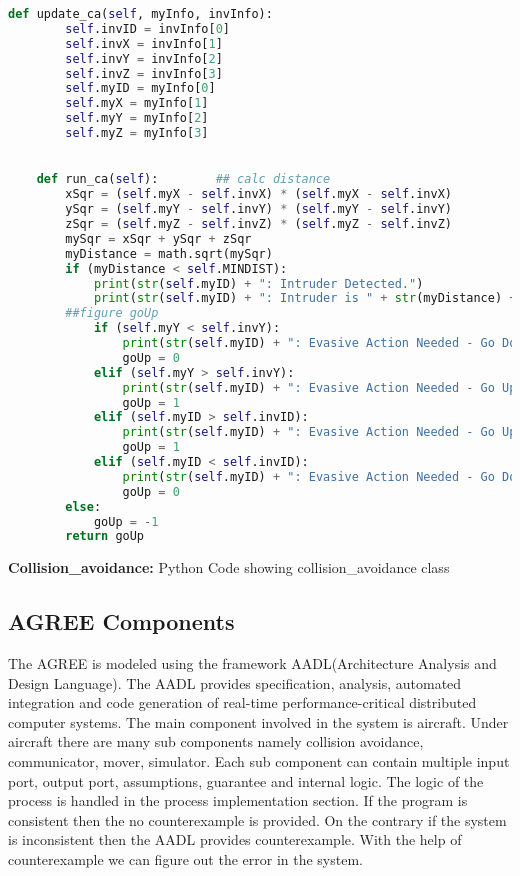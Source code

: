 \documentclass[12pt]{report}
\theoremstyle{plain}
\theoremstyle{definition}
\begin{document}
\begin{lstlisting}[language =Python]
    def update_ca(self, myInfo, invInfo):
        self.invID = invInfo[0]
        self.invX = invInfo[1]
        self.invY = invInfo[2]
        self.invZ = invInfo[3]
        self.myID = myInfo[0]
        self.myX = myInfo[1]
        self.myY = myInfo[2]
        self.myZ = myInfo[3]

    
    def run_ca(self):        ## calc distance
        xSqr = (self.myX - self.invX) * (self.myX - self.invX)
        ySqr = (self.myY - self.invY) * (self.myY - self.invY)
        zSqr = (self.myZ - self.invZ) * (self.myZ - self.invZ)
        mySqr = xSqr + ySqr + zSqr
        myDistance = math.sqrt(mySqr)
        if (myDistance < self.MINDIST):
            print(str(self.myID) + ": Intruder Detected.")
            print(str(self.myID) + ": Intruder is " + str(myDistance) + " units away.")
        ##figure goUp
            if (self.myY < self.invY):
                print(str(self.myID) + ": Evasive Action Needed - Go Down!")
                goUp = 0
            elif (self.myY > self.invY):
                print(str(self.myID) + ": Evasive Action Needed - Go Up!")
                goUp = 1
            elif (self.myID > self.invID):
                print(str(self.myID) + ": Evasive Action Needed - Go Up!")
                goUp = 1
            elif (self.myID < self.invID):
                print(str(self.myID) + ": Evasive Action Needed - Go Down!")
                goUp = 0
        else:
            goUp = -1
        return goUp
\end{lstlisting}
\begin{center}
\footnotesize{\textbf{Collision\_avoidance:} Python Code showing collision\_avoidance class}
\end{center}
\subsection*{AGREE Components}
The AGREE is modeled using the framework AADL(Architecture Analysis and Design Language). The AADL provides  specification, analysis, automated integration and code generation of real-time performance-critical distributed computer systems. The main component involved in the system is aircraft. Under aircraft there are many sub components namely collision avoidance, communicator, mover, simulator. Each sub component can contain multiple input port, output port, assumptions, guarantee and internal logic. The logic of the process is handled in the process implementation section. If the program is consistent then the no counterexample is provided. On the contrary if the system is inconsistent then the AADL provides counterexample. With the help of counterexample we can figure out the error in the system.
\end{document}
